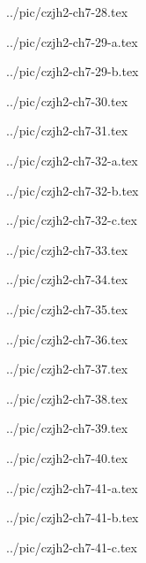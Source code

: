 ../pic/czjh2-ch7-28.tex



../pic/czjh2-ch7-29-a.tex



../pic/czjh2-ch7-29-b.tex



../pic/czjh2-ch7-30.tex



../pic/czjh2-ch7-31.tex



../pic/czjh2-ch7-32-a.tex



../pic/czjh2-ch7-32-b.tex



../pic/czjh2-ch7-32-c.tex



../pic/czjh2-ch7-33.tex



../pic/czjh2-ch7-34.tex



../pic/czjh2-ch7-35.tex



../pic/czjh2-ch7-36.tex



../pic/czjh2-ch7-37.tex



../pic/czjh2-ch7-38.tex



../pic/czjh2-ch7-39.tex



../pic/czjh2-ch7-40.tex



../pic/czjh2-ch7-41-a.tex



../pic/czjh2-ch7-41-b.tex



../pic/czjh2-ch7-41-c.tex




